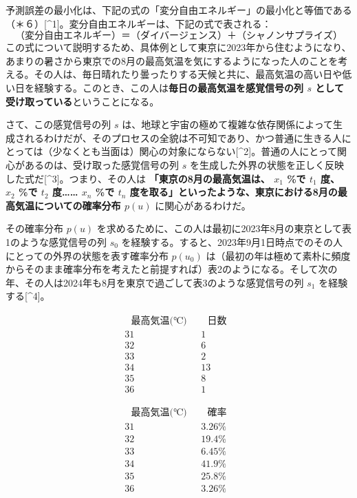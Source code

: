 予測誤差の最小化は、下記の式の「変分自由エネルギー」の最小化と等価である（＊６）{[}\^{}1{]}。変分自由エネルギーは、下記の式で表される：
\[
（変分自由エネルギー）＝（ダイバージェンス）＋（シャノンサプライズ）\tag{1}
\]
この式について説明するため、具体例として東京に2023年から住むようになり、あまりの暑さから東京での8月の最高気温を気にするようになった人のことを考える。その人は、毎日晴れたり曇ったりする天候と共に、最高気温の高い日や低い日を経験する。このとき、この人は\textbf{毎日の最高気温を感覚信号の列
\(s\) として受け取っている}ということになる。

さて、この感覚信号の列 \(s\)
は、地球と宇宙の極めて複雑な依存関係によって生成されるわけだが、そのプロセスの全貌は不可知であり、かつ普通に生きる人にとっては（少なくとも当面は）関心の対象にならない{[}\^{}2{]}。普通の人にとって関心があるのは、受け取った感覚信号の列
\(s\)
を生成した外界の状態を正しく反映した式だ{[}\^{}3{]}。つまり、その人は
\textbf{「東京の8月の最高気温は、 \(x_1\) \%で \(t_1\) 度、 \(x_2\) \%で
\(t_2\) 度\ldots\ldots{} \(x_n\) \%で \(t_n\)
度を取る」といったような、東京における8月の最高気温についての確率分布
\(p(u)\)} に関心があるわけだ。

その確率分布 \(p(u)\)
を求めるために、この人は最初に2023年8月の東京として表1のような感覚信号の列
\(s_0\)
を経験する。すると、2023年9月1日時点でのその人にとっての外界の状態を表す確率分布
\(p(u_0)\)
は（最初の年は極めて素朴に頻度からそのまま確率分布を考えたと前提すれば）表2のようになる。そして次の年、その人は2024年も8月を東京で過ごして表3のような感覚信号の列
\(s_1\) を経験する{[}\^{}4{]}。

\[
\begin{array}{cc}
~~~\textrm{最高気温(℃)}~~~ & ~~~\textrm{日数}~~~ \\
\hline
\textrm{31} & \textrm{1} \\
\textrm{32} & \textrm{6} \\
\textrm{33} & \textrm{2} \\
\textrm{34} & \textrm{13} \\
\textrm{35} & \textrm{8} \\
\textrm{36} & \textrm{1}
\end{array}
\tag{表1}
\]

\[
\begin{array}{cc}
~~~\textrm{最高気温(℃)}~~~ & ~~~\textrm{確率}~~~ \\
\hline
\textrm{31} & \textrm{3.26\%} \\
\textrm{32} & \textrm{19.4\%} \\
\textrm{33} & \textrm{6.45\%} \\
\textrm{34} & \textrm{41.9\%} \\
\textrm{35} & \textrm{25.8\%} \\
\textrm{36} & \textrm{3.26\%}
\end{array}
\tag{表2}
\]

